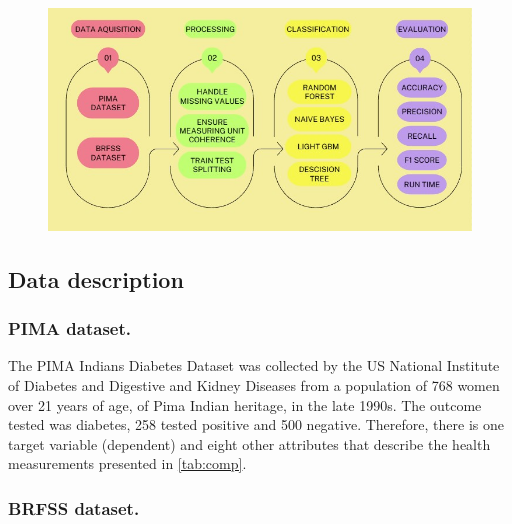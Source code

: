 \documentclass[runningheads]{llncs}
\begin{document}
\begin{figure}[htbp]
\centering
    \includegraphics[width=0.5\linewidth]{images/steps.jpg}
    \label{algorithm}
\end{figure}


\subsection{Data description}
\label{section:dataDescription}
\subsubsection{PIMA dataset.}

The PIMA Indians Diabetes Dataset \cite{pimaDataset} was collected by the US National Institute of Diabetes and Digestive and Kidney Diseases from a population of 768 women over 21 years of age, of Pima Indian heritage, in the late 1990s. The outcome tested was diabetes, 258 tested positive and 500 negative. Therefore, there is one target variable (dependent) and eight other attributes that describe the health measurements presented in \autoref{tab:comp}. 


\subsubsection{BRFSS dataset.}
\end{document}
